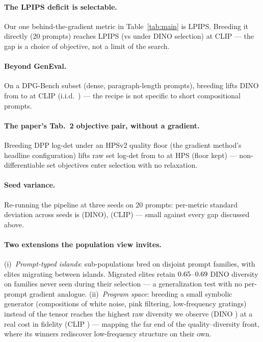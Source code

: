 \documentclass[10pt,twocolumn,letterpaper]{article}
\begin{document}
\ifdefined\nbLpipsProbeLpips
\paragraph{The LPIPS deficit is selectable.} Our one behind-the-gradient
metric in Table~\ref{tab:main} is LPIPS. Breeding it directly (20 prompts)
reaches \nbLpipsProbeLpips{} LPIPS (vs \nbBredLpips{} under DINO selection)
at \nbLpipsProbeClip{} CLIP --- the gap is a choice of objective, not a limit
of the search.
\fi

\ifdefined\nbDpgBredDino
\paragraph{Beyond GenEval.} On a DPG-Bench subset (dense, paragraph-length
prompts), breeding lifts DINO from \nbDpgInitDino{} to \nbDpgBredDino{} at
CLIP \nbDpgBredClip{} (i.i.d.\ \nbDpgInitClip) --- the recipe is not specific
to short compositional prompts.
\fi

\ifdefined\nbDppHpsBredDpp
\paragraph{The paper's Tab.~2 objective pair, without a gradient.} Breeding
DPP log-det under an HPSv2 quality floor (the gradient method's headline
configuration) lifts raw set log-det from \nbDppHpsInitDpp{} to
\nbDppHpsBredDpp{} at HPS \nbDppHpsBredHps{} (floor kept) --- non-differentiable
set objectives enter selection with no relaxation.
\fi

\ifdefined\nbSeedStdDino
\paragraph{Seed variance.} Re-running the pipeline at three seeds on 20
prompts: per-metric standard deviation across seeds is \nbSeedStdDino{}
(DINO), \nbSeedStdClip{} (CLIP) --- small against every gap discussed above.
\fi

\paragraph{Two extensions the population view invites.}
(i)~\emph{Prompt-typed islands}: sub-populations bred on disjoint prompt
families, with elites migrating between islands. Migrated elites retain
$0.65$--$0.69$ DINO diversity on families never
seen during their selection --- a generalization test with no per-prompt
gradient analogue. (ii)~\emph{Program space}: breeding a small symbolic
generator (compositions of white noise, pink filtering, low-frequency
gratings) instead of the tensor reaches the highest raw diversity we observe
(DINO \nbGpDino) at a real cost in fidelity (CLIP \nbGpClip) --- mapping the
far end of the quality--diversity front, where its winners rediscover
low-frequency structure on their own.
\end{document}
